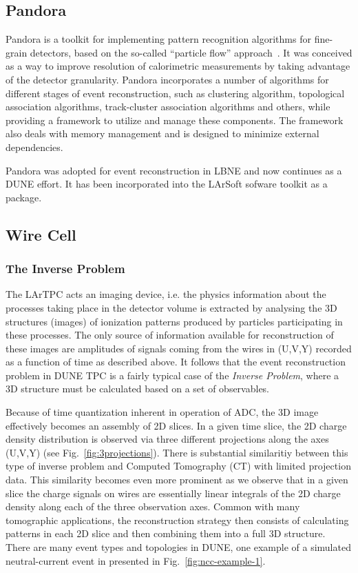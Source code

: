 \subsection{Pandora}
\label{sec:pandora}
 Pandora is a toolkit for implementing pattern recognition algorithms for fine-grain detectors, based on the so-called ``particle flow'' approach~\cite{pandora}.
It was conceived as a way to improve resolution of calorimetric measurements by taking advantage of the detector granularity. Pandora incorporates a
number of algorithms for different stages of event reconstruction, such as clustering algorithm, topological association algorithms, track-cluster association
algorithms and others, while providing a framework to utilize and manage these components. The framework also deals with memory management
and is designed to minimize external dependencies.

Pandora was adopted for event reconstruction in LBNE and now continues as a DUNE effort. It has been incorporated into the LArSoft sofware toolkit
as a package.



\subsection{Wire Cell}
\label{sec:wirecell}
\subsubsection{The Inverse Problem}

The LArTPC acts an imaging device, i.e. the physics information about the processes taking place in the detector volume is extracted by
analysing the 3D structures (images) of ionization patterns produced by particles participating in these processes. The only source of information
available for reconstruction of these images are amplitudes of signals coming from the wires in (U,V,Y) recorded as a function of time
as described above. It follows that the event reconstruction problem in DUNE TPC is a fairly typical case of the \textit{Inverse Problem},
where a 3D structure must be calculated based on a set of observables.

Because of time quantization inherent in operation of ADC, the 3D image effectively becomes an assembly of 2D slices.
In a given time slice, the 2D charge density distribution is observed via three different projections along the axes (U,V,Y) (see Fig.~\ref{fig:3projections}).
There is substantial similaritiy between this type of inverse problem and Computed Tomography (CT) with limited projection data. This similarity becomes even more prominent as we observe that in a
given slice the charge signals on wires are essentially linear integrals of the 2D charge density along each of the three observation axes. Common with many tomographic applications, the reconstruction strategy
then consists of calculating patterns in each 2D slice and then combining them into a full 3D structure. There are many event types and topologies
in DUNE, one example of a simulated neutral-current event in presented in Fig.~\ref{fig:ncc-example-1}.

